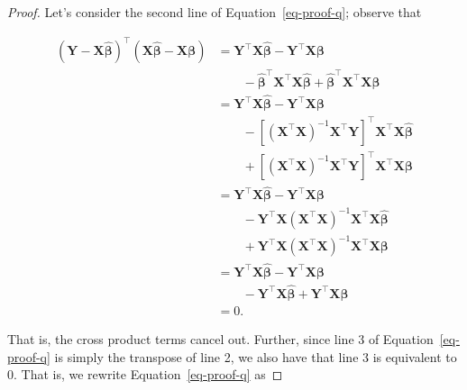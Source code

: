 \documentclass[
  letterpaper,
  DIV=11,
  numbers=noendperiod]{scrreprt}
\theoremstyle{definition}
\theoremstyle{plain}
\theoremstyle{definition}
\theoremstyle{remark}
\begin{document}
\begin{proof}
Let's consider the second line of Equation~\ref{eq-proof-q}; observe
that

\[
\begin{aligned}
  \left(\mathbf{Y} - \mathbf{X}\widehat{\boldsymbol{\beta}}\right)^\top \left(\mathbf{X}\widehat{\boldsymbol{\beta}} - \mathbf{X}\boldsymbol{\beta}\right)
    &= \mathbf{Y}^\top \mathbf{X}\widehat{\boldsymbol{\beta}} - \mathbf{Y}^\top \mathbf{X} \boldsymbol{\beta} \\
    &\qquad - \widehat{\boldsymbol{\beta}}^\top \mathbf{X}^\top \mathbf{X} \widehat{\boldsymbol{\beta}} + \widehat{\boldsymbol{\beta}}^\top \mathbf{X}^\top \mathbf{X} \boldsymbol{\beta} \\
    &= \mathbf{Y}^\top \mathbf{X}\widehat{\boldsymbol{\beta}} - \mathbf{Y}^\top \mathbf{X} \boldsymbol{\beta} \\
    &\qquad - \left[\left(\mathbf{X}^\top \mathbf{X}\right)^{-1} \mathbf{X}^\top \mathbf{Y}\right]^\top \mathbf{X}^\top \mathbf{X} \widehat{\boldsymbol{\beta}} \\
    &\qquad + \left[\left(\mathbf{X}^\top \mathbf{X}\right)^{-1} \mathbf{X}^\top \mathbf{Y}\right]^\top \mathbf{X}^\top \mathbf{X} \boldsymbol{\beta} \\
    &= \mathbf{Y}^\top \mathbf{X}\widehat{\boldsymbol{\beta}} - \mathbf{Y}^\top \mathbf{X} \boldsymbol{\beta} \\
    &\qquad - \mathbf{Y}^\top \mathbf{X} \left(\mathbf{X}^\top \mathbf{X}\right)^{-1}  \mathbf{X}^\top \mathbf{X} \widehat{\boldsymbol{\beta}} \\
    &\qquad + \mathbf{Y}^\top \mathbf{X} \left(\mathbf{X}^\top \mathbf{X}\right)^{-1} \mathbf{X}^\top \mathbf{X} \boldsymbol{\beta} \\
    &= \mathbf{Y}^\top \mathbf{X}\widehat{\boldsymbol{\beta}} - \mathbf{Y}^\top \mathbf{X} \boldsymbol{\beta} \\
    &\qquad - \mathbf{Y}^\top \mathbf{X} \widehat{\boldsymbol{\beta}} + \mathbf{Y}^\top \mathbf{X} \boldsymbol{\beta} \\
    &= 0.
\end{aligned}
\]

That is, the cross product terms cancel out. Further, since line 3 of
Equation~\ref{eq-proof-q} is simply the transpose of line 2, we also
have that line 3 is equivalent to 0. That is, we rewrite
Equation~\ref{eq-proof-q} as


\end{proof}
\end{document}
